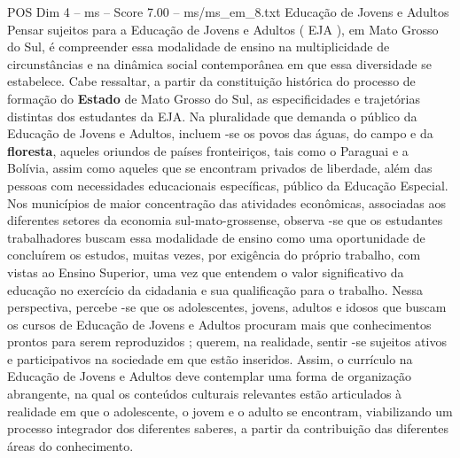 \begin{textsample}{POS Dim 4 – ms – Score 7.00 – ms/ms\_em\_8.txt}
Educação de Jovens e Adultos Pensar sujeitos para a Educação de Jovens e Adultos ( EJA ), em Mato Grosso do Sul, é compreender essa modalidade de ensino na multiplicidade de circunstâncias e na dinâmica social contemporânea em que essa diversidade se estabelece.
Cabe ressaltar, a partir da constituição histórica do processo de formação do \textbf{Estado} de Mato Grosso do Sul, as especificidades e trajetórias distintas dos estudantes da EJA.
Na pluralidade que demanda o público da Educação de Jovens e Adultos, incluem -se os povos das águas, do campo e da \textbf{floresta}, aqueles oriundos de países fronteiriços, tais como o Paraguai e a Bolívia, assim como aqueles que se encontram privados de liberdade, além das pessoas com necessidades educacionais específicas, público da Educação Especial.
Nos municípios de maior concentração das atividades econômicas, associadas aos diferentes setores da economia sul-mato-grossense, observa -se que os estudantes trabalhadores buscam essa modalidade de ensino como uma oportunidade de concluírem os estudos, muitas vezes, por exigência do próprio trabalho, com vistas ao Ensino Superior, uma vez que entendem o valor significativo da educação no exercício da cidadania e sua qualificação para o trabalho.
Nessa perspectiva, percebe -se que os adolescentes, jovens, adultos e idosos que buscam os cursos de Educação de Jovens e Adultos procuram mais que conhecimentos prontos para serem reproduzidos ; querem, na realidade, sentir -se sujeitos ativos e participativos na sociedade em que estão inseridos.
Assim, o currículo na Educação de Jovens e Adultos deve contemplar uma forma de organização abrangente, na qual os conteúdos culturais relevantes estão articulados à realidade em que o adolescente, o jovem e o adulto se encontram, viabilizando um processo integrador dos diferentes saberes, a partir da contribuição das diferentes áreas do conhecimento.

\end{textsample}
